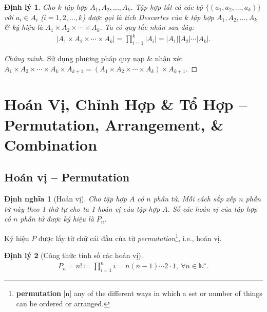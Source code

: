 \documentclass[oneside]{book}
\numberwithin{equation}{section}
\newtheorem{dinhnghia}{Định nghĩa}[section]
\newtheorem{dinhly}{Định lý}[section]
\begin{document}
\begin{dinhly}
	Cho $k$ tập hợp $A_1,A_2,\ldots,A_k$. Tập hợp tất cả các bộ $\{(a_1,a_2,\ldots,a_k)\}$ với $a_i\in A_i$ ($i = 1,2,\ldots,k$) được gọi là \emph{tích Descartes của $k$ tập hợp $A_1,A_2,\ldots,A_k$} \& ký hiệu là $A_1\times A_2\times\cdots\times A_k$. Ta có quy tắc nhân sau đây:
	\begin{align*}
		|A_1\times A_2\times\cdots\times A_k| = \prod_{i=1}^k |A_i| = |A_1||A_2|\cdots|A_k|.
	\end{align*}
\end{dinhly}

\begin{proof}[Chứng minh]
	Sử dụng phương pháp quy nạp \& nhận xét $A_1\times A_2\times\cdots\times A_k\times A_{k+1} = (A_1\times A_2\times\cdots\times A_k)\times A_{k+1}$.
\end{proof}


\section{Hoán Vị, Chỉnh Hợp \& Tổ Hợp -- Permutation, Arrangement, \& Combination}

\subsection{Hoán vị -- Permutation}

\begin{dinhnghia}[Hoán vị]
	Cho tập hợp $A$ có $n$ phần tử. Mỗi cách sắp xếp $n$ phần tử này theo 1 thứ tự cho ta 1 hoán vị của tập hợp $A$. Số các hoán vị của tập hợp có $n$ phần tử được ký hiệu là $P_n$.
\end{dinhnghia}
Ký hiệu $P$ được lấy từ chữ cái đầu của từ \textit{permutation}\footnote{\textbf{permutation} [n] any of the different ways in which a set or number of things can be ordered or arranged.}, i.e., hoán vị.

\begin{dinhly}[Công thức tính số các hoán vị]
	\begin{align}
		\label{hoan vi}
		P_n = n!\coloneqq\prod_{i=1}^n i = n(n - 1)\cdots 2\cdot 1,\ \forall n\in\mathbb{N}^\star.
	\end{align}
\end{dinhly}
\end{document}
